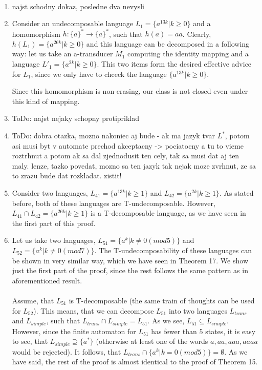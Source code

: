 \paragraph{}
\dokaz
\begin{enumerate}
\item \color{red}najst schodny dokaz, posledne dva nevysli\color{black}

\item Consider an undecomposable language $L_1 = \{ a^{13k} | k \geq 0 \}$ and a homomorphism $h:\{ a\}^* \to \{ a \}^*$, such that $h(a) = aa$. Clearly, $h(L_1) = \{ a^{26k} | k \geq 0 \}$ and this language can be decomposed in a following way: let us take an a-transducer $M_1$ computing the identity mapping and a language $L'_1 = \{ a^{2k} | k \geq 0 \}$. This two items form the desired effective advice for $L_1$, since we only have to chceck the language $\{ a^{13k} | k \geq 0 \}$.

Since this homomorphism is non-erasing, our class is not closed even under this kind of mapping.

\item \color{red}ToDo: najst nejaky schopny protipriklad\color{black}

\item \color{red}ToDo: dobra otazka, mozno nakoniec aj bude - ak ma jazyk  tvar $L^*$, potom asi musi byt v automate prechod akceptacny -> pociatocny a tu to vieme roztrhnut a potom ak sa dal zjednodusit ten cely, tak sa musi dat aj ten maly. lenze, tazko povedat, mozno sa ten jazyk tak nejak moze zvrhnut, ze sa to zrazu bude dat rozkladat. zistit!\color{black}

\item Consider two languages, $L_{41} = \{ a^{13k} | k \geq 1 \}$ and $L_{42} = \{ a^{2k} | k \geq 1 \}$. As stated before, both of these languages are T-undecomposable. However, $L_{41} \cap L_{42} = \{ a^{26k} | k \geq 1 \}$ is a T-decomposable language, as we have seen in the first part of this proof.

\item Let us take two languages, $L_{51} = \{ a^k | k \neq 0 (mod 5) \}$ and $L_{52} = \{ a^k | k \neq 0 (mod 7) \}$. The T-undecomposability of these languages can be shown in very similar way, which we have seen in Theorem 17. We show just the first part of the proof, since the rest follows the same pattern as in aforementioned result.

\paragraph{}
Assume, that $L_{51}$ is T-decomposable (the same train of thoughts can be used for $L_{52}$). This means, that we can decompose $L_{51}$ into two languages $L_{trans}$ and $L_{simple}$, such that $L_{trans} \cap L_{simple} = L_{51}$. As we see, $L_{51} \subseteq L_{simple}$. However, since the finite automaton for $L_{51}$ has fewer than $5$ states, it is easy to see, that $L_{simple} \supseteq \{a^*\}$ (otherwise at least one of the words $a, aa, aaa, aaaa$ would be rejected). It  follows, that $L_{trans} \cap \{ a^k | k = 0 (mod 5) \} = \emptyset$. As we  have said, the rest of the proof is almost identical to the proof of Theorem 15.


\end{enumerate}
